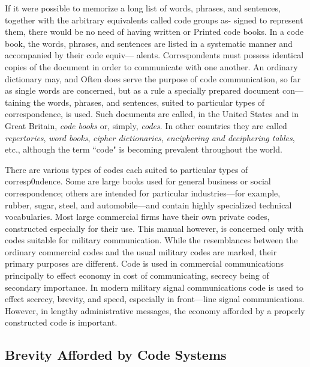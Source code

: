 \mypara If it were possible to memorize a long list of words, phrases, and
sentences, together with the arbitrary equivalents called code groups as-
signed to represent them, there would be no need of having written or
Printed code books. In a code book, the words, phrases, and sentences
are listed in a systematic manner and accompanied by their code equiv—
alents. Correspondents must possess identical copies of the document in
order to communicate with one another. An ordinary dictionary may, and
Often does serve the purpose of code communication, so far as single
words are concerned, but as a rule a specially prepared document con—
taining the words, phrases, and sentences, suited to particular types of
correspondence, is used. Such documents are called, in the United States
and in Great Britain, \textit{code books} or, simply, \textit{codes}. In other countries
they are called \textit{repertories}, \textit{word books}, \textit{cipher dictionaries}, \textit{enciphering
and deciphering tables}, etc., although the term “code" is becoming prevalent throughout the world.

\mypara There are various types of codes each suited to particular types of
corresp0ndence. Some are large books used for general business or social
correspondence; others are intended for particular industries—for
example, rubber, sugar, steel, and automobile—and contain highly specialized technical vocabularies. Most large commercial ﬁrms have their
own private codes, constructed especially for their use. This manual
however, is concerned only with codes suitable for military communication. While the resemblances between the ordinary commercial codes and
the usual military codes are marked, their primary purposes are different.
Code is used in commercial communications principally to effect economy
in cost of communicating, secrecy being of secondary importance. In
modern military signal communications code is used to effect secrecy,
brevity, and speed, especially in front—line signal communications. However, in lengthy administrative messages, the economy afforded by a
properly constructed code is important.

\subsection{Brevity Afforded by Code Systems}

